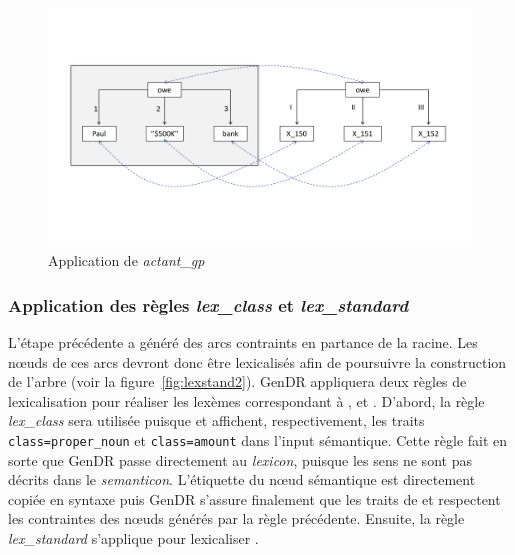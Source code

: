 \begin{figure}[htb]
	\centering
	\includegraphics[width=1\textwidth, trim = {0cm 4.8cm 0cm 4.2cm},clip]{ch3/figs/application_actant_gp.pdf}
	\caption{Application de \emph{actant\_gp}}
	\label{fig:actantgp}
\end{figure}

\subsubsection{Application des règles \emph{lex\_class} et \emph{lex\_standard}}

L'étape précédente a généré des arcs contraints en partance de la racine. Les n\oe{}uds de ces arcs devront donc être lexicalisés afin de poursuivre la construction de l'arbre (voir la figure~\ref{fig:lexstand2}). GenDR appliquera deux règles de lexicalisation pour réaliser les lexèmes correspondant à ,  et . D'abord, la règle \emph{lex\_class} sera utilisée puisque  et  affichent, respectivement, les traits \texttt{class=proper\_noun} et \texttt{class=amount} dans l'input sémantique. Cette règle fait en sorte que GenDR passe directement au \emph{lexicon}, puisque les sens ne sont pas décrits dans le \emph{semanticon}. L'étiquette du n\oe{}ud sémantique est directement copiée en syntaxe puis GenDR s'assure finalement que les traits de  et  respectent les contraintes des n\oe{}uds générés par la règle précédente. Ensuite, la règle \emph{lex\_standard} s'applique pour lexicaliser .

